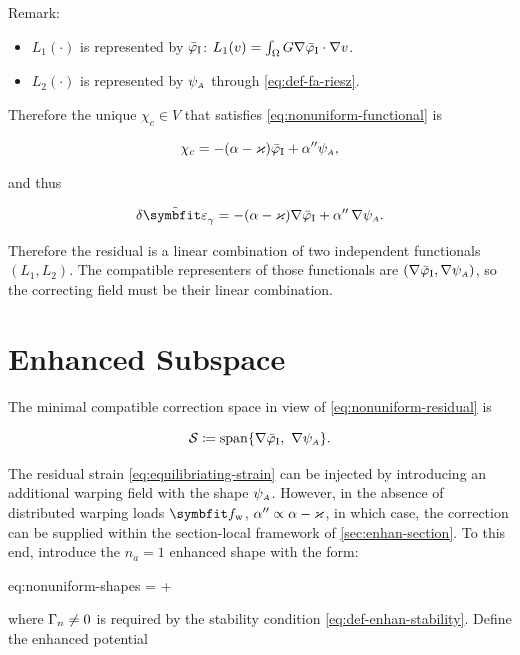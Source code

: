 Remark:

\begin{itemize}
\tightlist
\item
  \(L_1(\cdot)\) is represented by \(\bar{\varphi}_{\rm I}\):
  \(L_1(v)=\int_{\Omega} G\nabla\bar{\varphi}_{\rm I}\cdot\nabla v\).
\item
  \(L_2(\cdot)\) is represented by \(\psi_{\scriptscriptstyle{A}}\)
  through \eqref{eq:def-fa-riesz}.
\end{itemize}

Therefore the unique \(\chi_c\in V\) that satisfies \eqref{eq:nonuniform-functional} is

\begin{equation}
\chi_c = -(\alpha-\varkappa)\bar{\varphi}_{\rm I} + \alpha''\psi_{\scriptscriptstyle{A}},
\label{eq:nonuniform-psi}
\end{equation}

and thus

\begin{equation}
\delta\tilde{\bm{\varepsilon}}_\gamma
= -(\alpha-\Twist)\nabla\WarpTwistIesan 
+ \alpha''\,\nabla\WarpFA.
\label{eq:equilibriating-strain}
\end{equation}

Therefore the residual is a linear combination of two independent functionals
\((L_1,L_2)\). The compatible representers of those functionals are
\((\nabla\bar{\varphi}_{\rm I},\nabla\psi_{\scriptscriptstyle{A}})\), so the correcting field must be
their linear combination.


\section{Enhanced Subspace}
\label{sec:nonuniform-enhanced}

The minimal compatible correction space in view of \eqref{eq:nonuniform-residual} is

\[
\mathcal S \coloneq  \operatorname{span}\{\nabla\WarpTwistIesan,\ \nabla\WarpFA\}.
\]


The residual strain \eqref{eq:equilibriating-strain} can be injected by introducing an additional warping field with the shape \(\psi_{\scriptscriptstyle{A}}\). 
However, in the absence of distributed warping loads \(\bm{f}_{\rm w}\),  \(\alpha'' \propto \alpha - \varkappa\), in which case, the correction can be supplied within the section-local framework of \cref{sec:enhan-section}.
To this end, introduce the \(n_a=1\) enhanced shape with the form:
\begin{SaveEquation}{eq:nonuniform-shapes}
\EnhanShapes = \nabla\WarpTwistIesan + \EnhanConstFA\,\nabla\WarpFA
\end{SaveEquation}
where \(\Gamma_{n} \neq 0\) is required by the stability condition \eqref{eq:def-enhan-stability}. 
Define the enhanced potential

